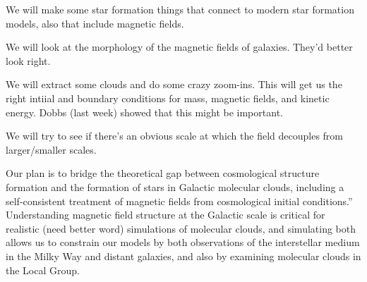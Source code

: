 We will make some star formation things that connect to modern star formation
models, also that include magnetic fields.

We will look at the morphology of the magnetic fields of galaxies.  They'd
better look right.

We will extract some clouds and do some crazy zoom-ins.  This will get us the
right intiial and boundary conditions for mass, magnetic fields, and kinetic
energy.  Dobbs (last week) showed that this might be important.

We will try to see if there's an obvious scale at which the field decouples from
larger/smaller scales.

Our plan is to bridge the theoretical gap between cosmological structure
formation and the formation of stars in Galactic molecular clouds, including a
self-consistent treatment of magnetic fields from cosmological initial
conditions.”  Understanding magnetic field structure at the Galactic scale is
critical for realistic (need better word) simulations of molecular clouds, and
simulating both allows us to constrain our models by both observations of the
interstellar medium in the Milky Way and distant galaxies, and also by examining
molecular clouds in the Local Group. 


